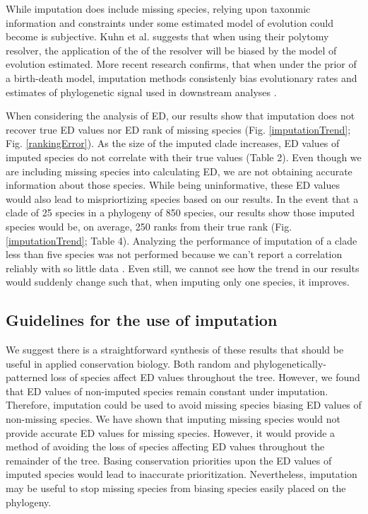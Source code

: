 \documentclass[12pt,english]{article}
\begin{document}
While imputation does include missing species, relying upon taxonmic information
and constraints under some estimated model of evolution could become is
subjective. Kuhn et al. \citeyear{2011} suggests that when using their polytomy
resolver, the application of the of the resolver will be biased by the model of
evolution estimated. More recent research confirms, that when under the prior of
a birth-death model, imputation methods consistenly bias evolutionary rates and
estimates of phylogenetic signal used in downstream analyses
\autocite{Rabosky2014}. 

When considering the analysis of ED, our results show that imputation does not
recover true ED values nor ED rank of missing species (Fig. \ref{imputationTrend};
 Fig. \ref{rankingError}). As the size of the imputed clade increases, ED values of imputed
species do not correlate with their true values (Table 2). Even though we are
including missing species into calculating ED, we are not obtaining accurate
information about those species. While being uninformative, these ED values
would also lead to mispriortizing species based on our results. In the event
that a clade of 25 species in a phylogeny of 850 species, our results show those
imputed species would be, on average, 250 ranks from their true rank (Fig.
\ref{imputationTrend}; Table 4). Analyzing the performance of imputation of a
clade less than five species was not performed because we can't report a
correlation reliably with so little data \autocite{Crawley2012}. Even still, we
cannot see how the trend in our results would suddenly change such that, when
imputing only one species, it improves.  


\subsection*{Guidelines for the use of imputation}
We suggest there is a straightforward synthesis of these results that should be
useful in applied conservation biology. Both random and
phylogenetically-patterned loss of species affect ED values throughout the tree.
However, we found that ED values of non-imputed species remain constant under
imputation. Therefore, imputation could be used to avoid missing species biasing
ED values of non-missing species. We have shown that imputing missing species
would not provide accurate ED values for missing species. However, it would
provide a method of avoiding the loss of species affecting ED values throughout
the remainder of the tree. Basing conservation priorities upon the ED values of
imputed species would lead to inaccurate prioritization. Nevertheless,
imputation may be useful to stop missing species from biasing species easily
placed on the phylogeny. 
\end{document}
